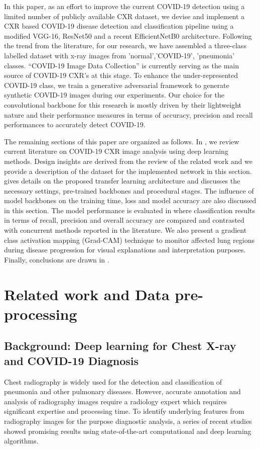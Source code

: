  
 In this paper, as an effort to improve the current COVID-19 detection using a limited number of publicly available CXR dataset,  we devise and implement a CXR based COVID-19 disease detection and classification pipeline using a modified VGG-16, ResNet50 \cite{he2016deep} and a recent EfficientNetB0 \cite{tan2019efficientnet} architecture. Following the trend from the literature, for our research, we have assembled a three-class labelled dataset with x-ray images from 'normal','COVID-19', 'pneumonia' classes. “COVID-19 Image Data Collection” \cite{cohen2020covid} is currently serving as the main source of COVID-19 CXR's at this stage. To enhance the under-represented COVID-19 class, we train a generative adversarial framework to generate synthetic COVID-19 images during our experiments. Our choice for the convolutional backbone for this research is mostly driven by their lightweight nature and their performance measures in terms of accuracy, precision and recall performances to accurately detect COVID-19.


The remaining sections of this paper are organized as follows. In , we review current literature on COVID-19 CXR image analysis using deep learning methods. Design insights are derived from the review of the related work and we provide a description of the dataset for the implemented network in this section.  gives details on the proposed transfer learning architecture and discusses the necessary settings, pre-trained backbones and procedural stages. The influence of model backbones on the training time, loss and model accuracy are also discussed in this section. The model performance is evaluated in  where classification results in terms of recall, precision and overall accuracy are compared and contrasted with concurrent methods reported in the literature. We also present a gradient class activation mapping (Grad-CAM) technique to monitor affected lung regions during disease progression for visual explanations and interpretation purposes. Finally, conclusions are drawn in .


\section{Related work and Data pre-processing}
\label{sec:background}
\subsection{ Background: Deep learning for Chest X-ray and COVID-19 Diagnosis}
Chest radiography is widely used for the detection and classification of pneumonia and other pulmonary diseases. However, accurate annotation and analysis of radiography images require a radiology expert which requires significant expertise and processing time.  
To identify underlying features from radiography images for the purpose diagnostic analysis, a series of recent studies showed promising results using state-of-the-art computational and deep learning algorithms. 

